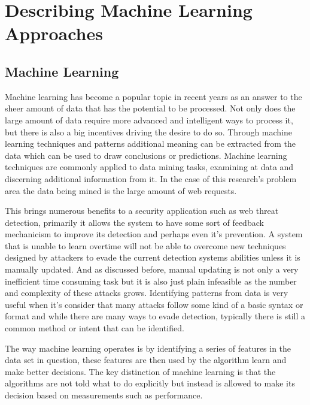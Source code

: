 \chapter{Describing Machine Learning Approaches} \label{sec:sectionFour}

\section{Machine Learning} \label{sec:machineLearning}

Machine learning has become a popular topic in recent years as an answer to the sheer amount of data that has the potential to be processed.  Not only does the large amount of data require more advanced and intelligent ways to process it, but there is also a big incentives driving the desire to do so.  Through machine learning techniques and patterns additional meaning can be extracted from the data which can be used to draw conclusions or predictions. \cite{dataManagementSystems}  Machine learning techniques are commonly applied to data mining tasks, examining at data and discerning additional information from it.  In the case of this research's problem area the data being mined is the large amount of web requests.

This brings numerous benefits to a security application such as web threat detection, primarily it allows the system to have some sort of feedback mechanicism to improve its detection and perhaps even it's prevention.  A system that is unable to learn overtime will not be able to overcome new techniques designed by attackers to evade the current detection systems abilities unless it is manually updated.  And as discussed before, manual updating is not only a very inefficient time consuming task but it is also just plain infeasible as the number and complexity of these attacks grows.  Identifying patterns from data is very useful when it's consider that many attacks follow some kind of a basic syntax or format and while there are many ways to evade detection, typically there is still a common method or intent that can be identified.

The way machine learning operates is by identifying a series of features in the data set in question, these features are then used by the algorithm learn and make better decisions.  The key distinction of machine learning is that the algorithms are not told what to do explicitly but instead is allowed to make its decision based on measurements such as performance. \cite{supervisedMachineLearning}
  
